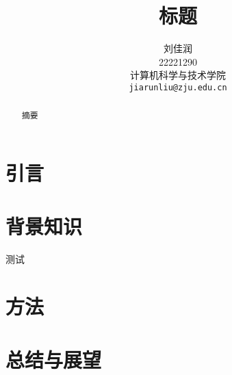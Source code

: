 \documentclass[10pt,twocolumn,letterpaper]{article}
\begin{document}
\title{标题}

\author{刘佳润\\
    22221290\\
    计算机科学与技术学院\\
    {\tt\small jiarunliu@zju.edu.cn}
}
\maketitle

\begin{abstract}
  摘要
\end{abstract}

\section{引言}
\label{sec:intro}



\section{背景知识}
\label{sec:related_work}

测试\cite{chiarot2021time}


\section{方法}



\section{总结与展望}


{\small


}
\end{document}
